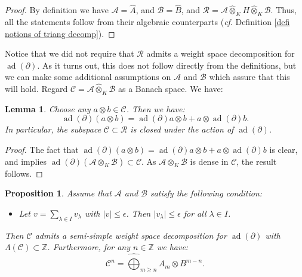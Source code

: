 \documentclass{amsart}
\newtheorem{prop}[defi]{ Proposition}
\newtheorem{Lemma}[defi]{Lemma}
\begin{document}
\begin{proof}
By definition we have $\mathscr{A}=\widehat{A}$, and $\mathscr{B}=\widehat{B}$, and $\mathscr{R}=\mathscr{A}\widehat{\otimes}_KH\widehat{\otimes}_K\mathscr{B}$. Thus, all the statements follow from their algebraic counterparts (\emph{cf}. Definition \ref{defi notions of triang decomp}). 
\end{proof}
Notice that we did not require that $\mathscr{R}$ admits a weight space decomposition for $\operatorname{ad}(\partial)$. As it turns out, this does not follow directly from the definitions, but we can make some additional assumptions on $\mathscr{A}$ and $\mathscr{B}$ which assure that this will hold.  Regard $\mathscr{C}=\mathscr{A}\widehat{\otimes}_K\mathscr{B}$ as a Banach space. We have:
\begin{Lemma}\label{Lemma R admits a ws decomposition}
Choose any $a\otimes b \in \mathscr{C}$. Then we have:
\begin{equation*}
    \operatorname{ad}(\partial)(a\otimes b)=\operatorname{ad}(\partial)a\otimes b + a \otimes \operatorname{ad}(\partial)b.
\end{equation*}
In particular, the subspace  $\mathscr{C}\subset \mathscr{R}$ is closed under the action of $\operatorname{ad}(\partial)$.
\end{Lemma}
\begin{proof}
The fact that $\operatorname{ad}(\partial)(a\otimes b)=\operatorname{ad}(\partial)a\otimes b + a\otimes \operatorname{ad}(\partial)b$ is clear, and implies $\operatorname{ad}(\partial)(\mathscr{A}\otimes_K\mathscr{B})\subset \mathscr{C}$. As $\mathscr{A}\otimes_K\mathscr{B}$ is dense in $\mathscr{C}$, the result follows.
\end{proof}
\begin{prop}\label{prop ws decomposition of C}
Assume that $\mathscr{A}$ and $\mathscr{B}$ satisfy the following condition:
\begin{itemize}
    \item Let $v=\sum_{\lambda\in I} v_{\lambda}$ with $\vert v \vert \leq \epsilon$. Then $\vert v_{\lambda}\vert \leq \epsilon$ for all $\lambda \in I$.
\end{itemize}
Then $\mathscr{C}$ admits a semi-simple weight space decomposition for $\operatorname{ad}(\partial)$ with $\Lambda(\mathscr{C})\subset\mathbb{Z}$. Furthermore, for any $n\in \mathbb{Z}$ we have:
\begin{equation*}
    \mathscr{C}^n=\widehat{\bigoplus}_{m\geq n}A_m\otimes B^{m-n}.
\end{equation*}
\end{prop}
\end{document}
